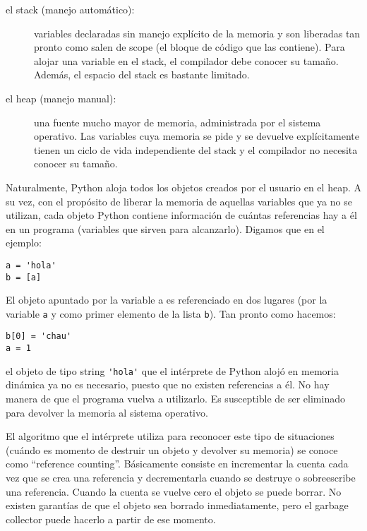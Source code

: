 \begin{description}
    \item[el stack (manejo automático):] variables declaradas sin manejo
explícito de la memoria y son liberadas tan pronto como salen de scope (el
bloque de código que las contiene). Para alojar una variable en el stack, el
compilador debe conocer su tamaño. Además, el espacio del stack es bastante
limitado.

    \item[el heap (manejo manual):] una fuente mucho mayor de memoria,
administrada por el sistema operativo. Las variables cuya memoria se pide y se
devuelve explícitamente tienen un ciclo de vida independiente del stack y el
compilador no necesita conocer su tamaño.
\end{description}

Naturalmente, Python aloja todos los objetos creados por el usuario en el heap.
A su vez, con el propósito de liberar la memoria de aquellas variables que ya
no se utilizan, cada objeto Python contiene información de cuántas referencias
hay a él en un programa (variables que sirven para alcanzarlo). Digamos que en
el ejemplo:

\begin{verbatim}
a = 'hola'
b = [a]
\end{verbatim}

El objeto apuntado por la variable a es referenciado en dos lugares (por la
variable \verb!a! y como primer elemento de la lista \verb!b!). Tan pronto como
hacemos:

\begin{verbatim}
b[0] = 'chau'
a = 1
\end{verbatim}

\noindent el objeto de tipo string \verb!'hola'! que el intérprete de Python
alojó en memoria dinámica ya no es necesario, puesto que no existen referencias
a él. No hay manera de que el programa vuelva a utilizarlo. Es susceptible de
ser eliminado para devolver la memoria al sistema operativo.

El algoritmo que el intérprete utiliza para reconocer este tipo de situaciones
(cuándo es momento de destruir un objeto y devolver su memoria) se conoce como
``reference counting''. Básicamente consiste en incrementar la cuenta cada vez
que se crea una referencia y decrementarla cuando se destruye o sobreescribe
una referencia. Cuando la cuenta se vuelve cero el objeto se puede borrar. No
existen garantías de que el objeto sea borrado inmediatamente, pero el garbage
collector puede hacerlo a partir de ese momento.


